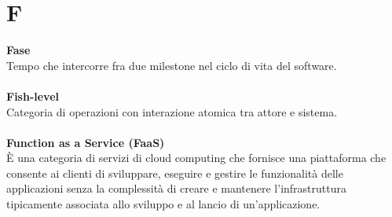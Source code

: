 \section{F}
\textbf{Fase}\\
Tempo che intercorre fra due milestone nel ciclo di vita del software. \\ \\
\textbf{Fish-level}\\
Categoria di operazioni con interazione atomica tra attore e sistema. \\ \\
\textbf{Function as a Service (FaaS)}\\
È una categoria di servizi di cloud computing che fornisce una piattaforma che consente ai clienti di sviluppare, eseguire e gestire le funzionalità delle applicazioni senza la complessità di creare e mantenere l'infrastruttura tipicamente associata allo sviluppo e al lancio di un'applicazione. \\ \\
\clearpage